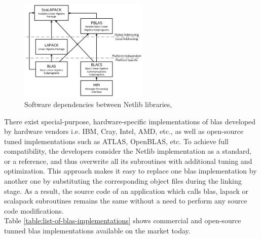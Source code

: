 \figpointer{\ref{fig:netlib:stack-of-libs}}
\begin{figure}[htpb]
  \centering
  \includegraphics[width=0.55\textwidth]{figures/chapter-2/lapack-scalapack-blas.png}
\caption{Software dependencies between Netlib libraries, \cite{netlib:lapack-scalapack-general-view}}
\label{fig:netlib:stack-of-libs}
\end{figure}


There exist special-purpose, hardware-specific implementations of \acrshort{blas} developed by hardware vendors i.e. IBM, Cray, Intel, AMD, etc., as well as open-source tuned implementations such as ATLAS, OpenBLAS, etc. To achieve full compatibility, the developers consider the Netlib implementation as a standard, or a reference, and thus overwrite all its subroutines with additional tuning and optimization. This approach makes it easy to replace one \acrshort{blas} implementation by another one by substituting the corresponding object files during the linking stage. As a result, the source code of an application which calls \acrshort{blas}, \acrshort{lapack} or \acrshort{scalapack} subroutines remains the same without a need to perform any source code modifications.\\
 

Table \ref{table:list-of-blas-implementations} shows commercial and open-source tunned \acrshort{blas} implementations available on the market today.\\

